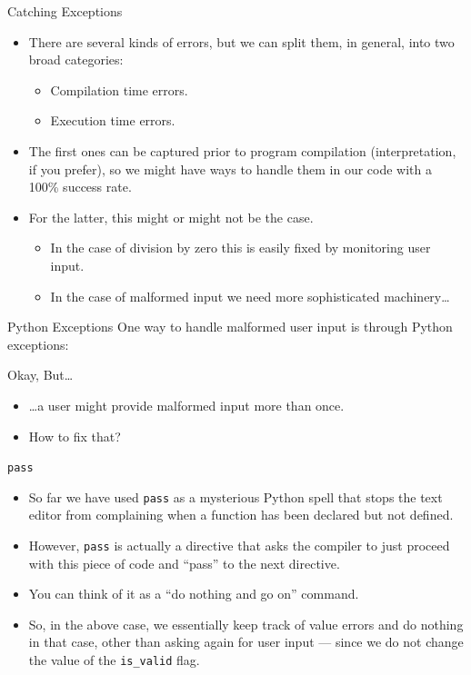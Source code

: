 \documentclass[aspectratio=169, 12pt, xcolor=table]{beamer}
\begin{document}
	\begin{frame}{Catching Exceptions}
		\begin{itemize}
			\item There are several kinds of errors, but we can split them, in general, into two broad categories:
			\begin{itemize}
				\item Compilation time errors.
				\item Execution time errors.
			\end{itemize}
			\item The first ones can be captured prior to program compilation (interpretation, if you prefer), so we might have ways to handle them in our code with a 100\% success rate.
			\item For the latter, this might or might not be the case.
			\begin{itemize}
				\item In the case of division by zero this is easily fixed by monitoring user input.
				\item In the case of malformed input we need more sophisticated machinery\ldots
			\end{itemize}
		\end{itemize}
	\end{frame}

	\begin{frame}{Python Exceptions}
		One way to handle malformed user input is through Python exceptions:
		
	\end{frame}

	\begin{frame}{Okay, But\ldots}
		\begin{itemize}
			\item \ldots a user might provide malformed input more than once.\pause
			\item How to fix that?\pause
		\end{itemize}
		
	\end{frame}

	\begin{frame}{\texttt{pass}}
		\begin{itemize}
			\item So far we have used \texttt{pass} as a mysterious Python spell that stops the text editor from complaining when a function has been declared but not defined.
			\item However, \texttt{pass} is actually a directive that asks the compiler to just proceed with this piece of code and ``pass'' to the next directive.
			\item You can think of it as a ``do nothing and go on'' command.
			\item So, in the above case, we essentially keep track of value errors and do nothing in that case, other than asking again for user input --- since we do not change the value of the \texttt{is\_valid} flag.
		\end{itemize}
	\end{frame}
\end{document}
